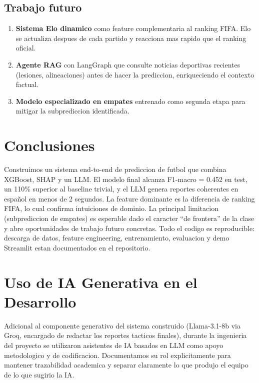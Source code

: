 \documentclass[10pt,twocolumn]{article}
\begin{document}
\subsection{Trabajo futuro}

\begin{enumerate}[leftmargin=*,topsep=2pt,itemsep=1pt]
  \item \textbf{Sistema Elo dinamico} como feature complementaria al ranking FIFA. Elo se actualiza despues de cada partido y reacciona mas rapido que el ranking oficial.
  \item \textbf{Agente RAG} con LangGraph que consulte noticias deportivas recientes (lesiones, alineaciones) antes de hacer la prediccion, enriqueciendo el contexto factual.
  \item \textbf{Modelo especializado en empates} entrenado como segunda etapa para mitigar la subprediccion identificada.
\end{enumerate}

\section{Conclusiones}

Construimos un sistema end-to-end de prediccion de futbol que combina XGBoost, SHAP y un LLM. El modelo final alcanza F1-macro = 0.452 en test, un 110\% superior al baseline trivial, y el LLM genera reportes coherentes en español en menos de 2 segundos. La feature dominante es la diferencia de ranking FIFA, lo cual confirma intuiciones de dominio. La principal limitacion (subprediccion de empates) es esperable dado el caracter ``de frontera'' de la clase y abre oportunidades de trabajo futuro concretas. Todo el codigo es reproducible: descarga de datos, feature engineering, entrenamiento, evaluacion y demo Streamlit estan documentados en el repositorio.

\section*{Uso de IA Generativa en el Desarrollo}
\label{sec:ia_dev}

Adicional al componente generativo del sistema construido (Llama-3.1-8b via Groq, encargado de redactar los reportes tacticos finales), durante la ingenieria del proyecto se utilizaron asistentes de IA basados en LLM como apoyo metodologico y de codificacion. Documentamos su rol explicitamente para mantener trazabilidad academica y separar claramente lo que produjo el equipo de lo que sugirio la IA.
\end{document}
